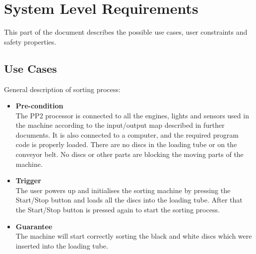 \documentclass[a4paper,oneside,11pt]{report}
\begin{document}
\section{System Level Requirements}
This part of the document describes the possible use cases, user constraints and safety properties.

\subsection{Use Cases}
General description of sorting process:
\begin{itemize}
  \item \textbf{Pre-condition}\\
  The PP2 processor is connected to all the engines, lights and sensors used in the machine according to the input/output map described in further documents. It is also connected to a computer, and the required program code is properly loaded. There are no discs in the loading tube or on the conveyor belt. No discs or other parts are blocking the moving parts of the machine.
  \item \textbf{Trigger}\\
  The user powers up and initialises the sorting machine by pressing the Start/Stop button and loads all the discs into the loading tube. After that the Start/Stop button is pressed again to start the sorting process.
  \item \textbf{Guarantee}\\
  The machine will start correctly sorting the black and white discs which were inserted into the loading tube.
\end{itemize}
\end{document}
